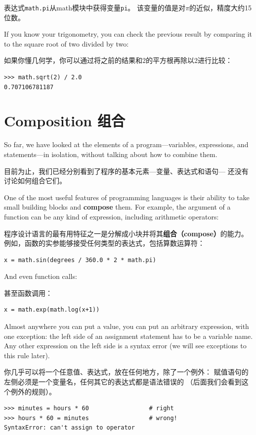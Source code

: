 \documentclass[10pt]{book}
\begin{document}
\begin{CJK}{UTF8}{gbsn}
表达式{\tt math.pi}从math模块中获得变量{\tt pi}。
该变量的值是对$\pi$的近似，精度大约15位数。

If you know
your trigonometry, you can check the previous result by comparing it to
the square root of two divided by two:

如果你懂几何学，你可以通过将之前的结果和2的平方根再除以2进行比较：

\begin{verbatim}
>>> math.sqrt(2) / 2.0
0.707106781187
\end{verbatim}
%

\section{Composition 组合}

So far, we have looked at the elements of a program---variables,
expressions, and statements---in isolation, without talking about how to
combine them.

目前为止，我们已经分别看到了程序的基本元素---变量、表达式和语句---
还没有讨论如何组合它们。

One of the most useful features of programming languages is their
ability to take small building blocks and {\bf compose} them.  For
example, the argument of a function can be any kind of expression,
including arithmetic operators:

程序设计语言的最有用特征之一是分解成小块并将其{\bf 组合（compose）}的能力。
例如，函数的实参能够接受任何类型的表达式，包括算数运算符：

\begin{verbatim}
x = math.sin(degrees / 360.0 * 2 * math.pi)
\end{verbatim}
%
And even function calls:

甚至函数调用：

\begin{verbatim}
x = math.exp(math.log(x+1))
\end{verbatim}
%
Almost anywhere you can put a value, you can put an arbitrary
expression, with one exception: the left side of an assignment
statement has to be a variable name.  Any other expression on the left
side is a syntax error (we will see exceptions to this rule
later).

你几乎可以将一个任意值、表达式，放在任何地方，除了一个例外：
赋值语句的左侧必须是一个变量名，任何其它的表达式都是语法错误的
（后面我们会看到这个例外的规则）。

\begin{verbatim}
>>> minutes = hours * 60                 # right
>>> hours * 60 = minutes                 # wrong!
SyntaxError: can't assign to operator
\end{verbatim}
%



\end{CJK}
\end{document}
